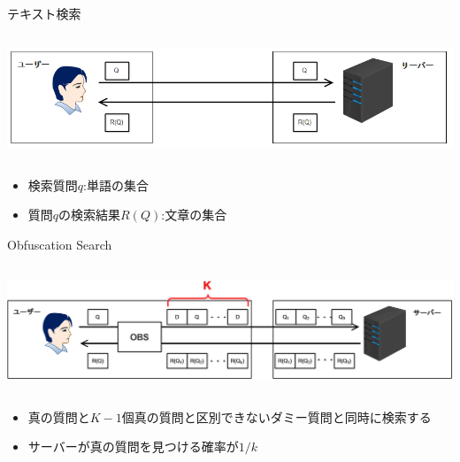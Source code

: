 \documentclass[14pt,xcolor=dvipsnames,table,dvipdfmx]{beamer}
\begin{document}
\begin{frame}{テキスト検索}
\begin{columns}[t]
    \begin{column}{0.8\textwidth} %
        \includegraphics[width=\columnwidth]{photo1.png}
    \end{column}
\end{columns}
    \begin{block}{}
    \begin{itemize}
        \item 検索質問$q$:単語の集合
        \item 質問$q$の検索結果$R(Q)$:文章の集合
    \end{itemize}
    \end{block}
\end{frame}

\begin{frame}{Obfuscation Search}
    \begin{columns}[t]
        \begin{column}{1\textwidth} %
            \includegraphics[width=\columnwidth]{rk4.png}
		\end{column}
    \end{columns}
	\begin{block}{} 
		\begin{itemize}
			\item 真の質問と$K-1$個真の質問と区別できないダミー質問と同時に検索する
			\item サーバーが真の質問を見つける確率が$1/k$
		\end{itemize}
	\end{block}
\end{frame}
\end{document}
